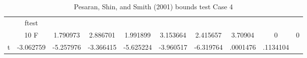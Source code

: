 \begin{table}[htbp]\centering
\caption{Pesaran, Shin, and Smith (2001) bounds test Case 4 \label{tab1}}
\begin{tabular}{l*{8}{c}}
\toprule
            &       ftest&            &            &            &            &            &            &            \\
            &    10%
\midrule
F           &    1.790973&    2.886701&    1.991899&    3.153664&    2.415657&     3.70904&           0&           0\\
t           &   -3.062759&   -5.257976&   -3.366415&   -5.625224&   -3.960517&   -6.319764&    .0001476&    .1134104\\
\bottomrule
\end{tabular}
\end{table}

